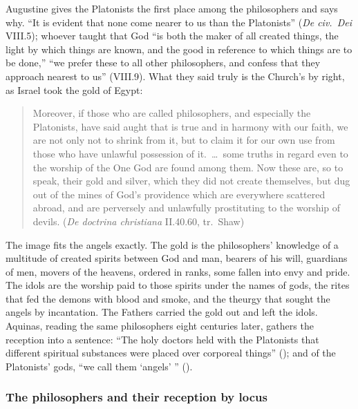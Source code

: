 Augustine gives the Platonists the first place among the philosophers
and says why. ``It is evident that none come nearer to us than the
Platonists'' (\emph{De civ.\ Dei} VIII.5); whoever taught that God ``is
both the maker of all created things, the light by which things are
known, and the good in reference to which things are to be done,'' ``we
prefer these to all other philosophers, and confess that they approach
nearest to us'' (VIII.9). What they said truly is the Church's by right,
as Israel took the gold of Egypt:
\begin{quote}
Moreover, if those who are called philosophers, and especially the
Platonists, have said aught that is true and in harmony with our faith,
we are not only not to shrink from it, but to claim it for our own use
from those who have unlawful possession of it.~\dots\ some truths in
regard even to the worship of the One God are found among them. Now
these are, so to speak, their gold and silver, which they did not create
themselves, but dug out of the mines of God's providence which are
everywhere scattered abroad, and are perversely and unlawfully
prostituting to the worship of devils. (\emph{De doctrina christiana}
II.40.60, tr.\ Shaw)
\end{quote}
The image fits the angels exactly. The gold is the philosophers' knowledge
of a multitude of created spirits between God and man, bearers of his
will, guardians of men, movers of the heavens, ordered in ranks, some
fallen into envy and pride. The idols are the worship paid to those
spirits under the names of gods, the rites that fed the demons with
blood and smoke, and the theurgy that sought the angels by incantation.
The Fathers carried the gold out and left the idols. Aquinas, reading
the same philosophers eight centuries later, gathers the reception into
a sentence: ``The holy doctors held with the Platonists that different
spiritual substances were placed over corporeal things'' (); and of the Platonists' gods, ``we call them `angels' ''
().

\subsubsection{The philosophers and their reception by locus}\label{sec:bc-concordance}

